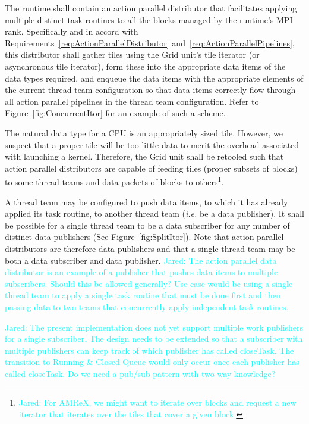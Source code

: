 \documentclass{article}
\newcommand{\Jared}[1]          {\textcolor{cyan}{Jared: #1}}
\newcommand{\taskroutine}        {task routine\xspace}
\newcommand{\taskroutines}       {task routines\xspace}
\begin{document}
\begin{req}
The runtime shall contain an action parallel distributor that facilitates
applying multiple distinct \taskroutines to all the blocks managed by the
runtime's MPI rank.  Specifically and in accord with
Requirements~\ref{req:ActionParallelDistributor}
and~\ref{req:ActionParallelPipelines}, this distributor shall gather tiles using
the Grid unit's tile iterator (or asynchronous tile iterator), form these into
the appropriate data items of the data types required, and enqueue the data
items with the appropriate elements of the current thread team configuration so
that data items correctly flow through all action parallel pipelines in the
thread team configuration.  Refer to Figure~\ref{fig:ConcurrentItor} for an
example of such a scheme.
\end{req}

\begin{req}
The natural data type for a CPU is an appropriately sized tile.  However, we
suspect that a proper tile will be too little data to merit the overhead associated
with launching a kernel.  Therefore, the Grid unit shall be retooled such that
action parallel distributors are capable of feeding tiles (proper subsets of blocks) to
some thread teams and data packets of blocks to
others\footnote{\Jared{For AMReX, we might want to iterate over blocks
and request a new iterator that iterates over the tiles that cover a given
block.}}.
\end{req}

\begin{req}
A thread team may be configured to push data items, to which it has already
applied its \taskroutine, to another thread team (\textit{i.e.} be a data publisher).
It shall be possible for a single thread
team to be a data subscriber for any number of distinct data
publishers (See Figure~\ref{fig:SplitItor}).  Note that action parallel
distributors are therefore data publishers and that a single thread team may be
both a data subscriber and data publisher.  \Jared{The action parallel data
distributor is an example of a publisher that pushes data items to multiple
subscribers.  Should this be allowed generally?  Use case would be using a
single thread team to apply a single \taskroutine that must be done first and then
passing data to two teams that concurrently apply independent \taskroutines.}
\end{req}

\Jared{The present implementation does not yet support multiple work
publishers for a single subscriber.  The design needs to be extended so that
a subscriber with multiple publishers can keep track of which publisher has
called closeTask.  The transition to Running \& Closed Queue would only occur
once each publisher has called closeTask.  Do we need a pub/sub pattern with
two-way knowledge?}
\end{document}
